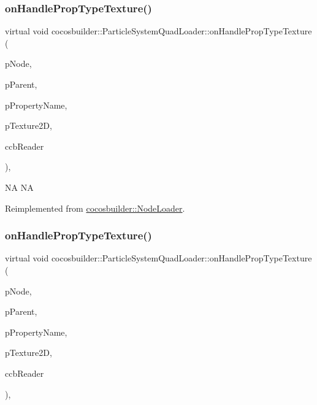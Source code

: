 \subsubsection{\texorpdfstring{on\+Handle\+Prop\+Type\+Texture()}{onHandlePropTypeTexture()}\hspace{0.1cm}{\footnotesize\ttfamily [1/2]}}
{\footnotesize\ttfamily virtual void cocosbuilder\+::\+Particle\+System\+Quad\+Loader\+::on\+Handle\+Prop\+Type\+Texture (\begin{DoxyParamCaption}\item[{cocos2d\+::\+Node $\ast$}]{p\+Node,  }\item[{cocos2d\+::\+Node $\ast$}]{p\+Parent,  }\item[{const char $\ast$}]{p\+Property\+Name,  }\item[{cocos2d\+::\+Texture2D $\ast$}]{p\+Texture2D,  }\item[{\hyperlink{classcocosbuilder_1_1CCBReader}{C\+C\+B\+Reader} $\ast$}]{ccb\+Reader }\end{DoxyParamCaption})\hspace{0.3cm}{\ttfamily [protected]}, {\ttfamily [virtual]}}

NA  NA 

Reimplemented from \hyperlink{classcocosbuilder_1_1NodeLoader}{cocosbuilder\+::\+Node\+Loader}.

\mbox{\label{classcocosbuilder_1_1ParticleSystemQuadLoader_a772ee73c21507af525fa3464dd99f44a}} 
\subsubsection{\texorpdfstring{on\+Handle\+Prop\+Type\+Texture()}{onHandlePropTypeTexture()}\hspace{0.1cm}{\footnotesize\ttfamily [2/2]}}
{\footnotesize\ttfamily virtual void cocosbuilder\+::\+Particle\+System\+Quad\+Loader\+::on\+Handle\+Prop\+Type\+Texture (\begin{DoxyParamCaption}\item[{cocos2d\+::\+Node $\ast$}]{p\+Node,  }\item[{cocos2d\+::\+Node $\ast$}]{p\+Parent,  }\item[{const char $\ast$}]{p\+Property\+Name,  }\item[{cocos2d\+::\+Texture2D $\ast$}]{p\+Texture2D,  }\item[{\hyperlink{classcocosbuilder_1_1CCBReader}{C\+C\+B\+Reader} $\ast$}]{ccb\+Reader }\end{DoxyParamCaption})\hspace{0.3cm}{\ttfamily [protected]}, {\ttfamily [virtual]}}

